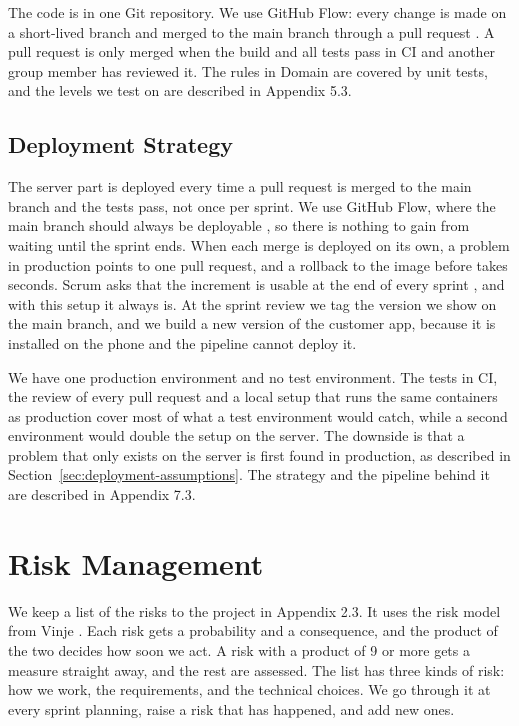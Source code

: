 The code is in one Git repository. We use GitHub Flow: every change is made on a
short-lived branch and merged to the main branch through a pull request
\cite{chacon-github-flow-2011}. A pull request is only merged when the build and all
tests pass in CI and another group member has reviewed it. The rules in Domain are
covered by unit tests, and the levels we test on are described in Appendix 5.3.

\subsection{Deployment Strategy}\label{sec:method-deployment}

The server part is deployed every time a pull request is merged to the main branch
and the tests pass, not once per sprint. We use GitHub Flow, where the main branch
should always be deployable \cite{chacon-github-flow-2011}, so there is nothing to gain
from waiting until the sprint ends. When each merge is deployed on its own, a problem
in production points to one pull request, and a rollback to the image before takes
seconds. Scrum asks that the increment is usable at the end of every sprint
\cite[p.~15]{schwaber-scrum-guide-2016}, and with this setup it always is. At the
sprint review we tag the version we show on the main branch, and we build a new
version of the customer app, because it is installed on the phone and the pipeline
cannot deploy it.

We have one production environment and no test environment. The tests in CI, the
review of every pull request and a local setup that runs the same containers as
production cover most of what a test environment would catch, while a second
environment would double the setup on the server. The downside is that a problem
that only exists on the server is first found in production, as described in
Section~\ref{sec:deployment-assumptions}. The strategy and the pipeline behind it
are described in Appendix 7.3.

\section{Risk Management}\label{sec:method-risk}

We keep a list of the risks to the project in Appendix 2.3. It uses the risk model
from Vinje \cite[sec.~5.4]{vinje-projektledelse}. Each risk gets a probability and a
consequence, and the product of the two decides how soon we act. A risk with a
product of 9 or more gets a measure straight away, and the rest are assessed. The
list has three kinds of risk: how we work, the requirements, and the technical
choices. We go through it at every sprint planning, raise a risk that has happened,
and add new ones.

